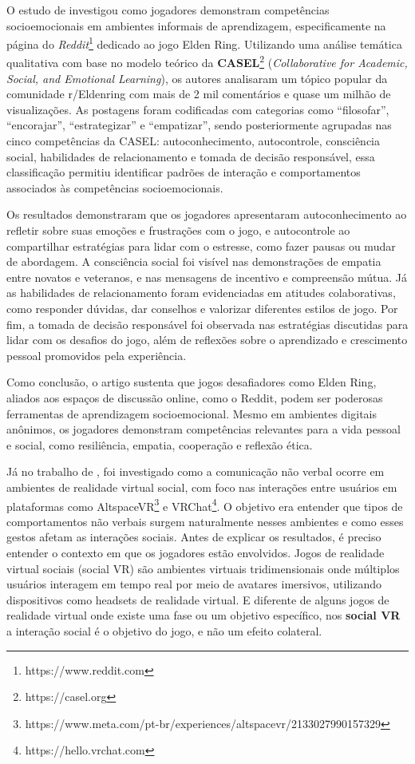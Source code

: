 
O  estudo de  investigou como jogadores demonstram competências socioemocionais em ambientes informais de aprendizagem, especificamente na página do \textit{Reddit}\footnote{https://www.reddit.com} dedicado ao jogo Elden Ring.
Utilizando uma análise temática qualitativa com base no modelo teórico da \textbf{CASEL}\footnote{https://casel.org} (\textit{Collaborative for Academic, Social, and Emotional Learning}), os autores analisaram um tópico popular da comunidade r/Eldenring com mais de 2 mil comentários e quase um milhão de visualizações.
As postagens foram codificadas com categorias como “filosofar”, “encorajar”, “estrategizar” e “empatizar”, sendo posteriormente agrupadas nas cinco competências da CASEL: autoconhecimento, autocontrole, consciência social, habilidades de relacionamento e tomada de decisão responsável, essa classificação permitiu identificar padrões de interação e comportamentos associados às competências socioemocionais.

Os resultados demonstraram que os jogadores apresentaram autoconhecimento ao refletir sobre suas emoções e frustrações com o jogo, e autocontrole ao compartilhar estratégias para lidar com o estresse, como fazer pausas ou mudar de abordagem.
A consciência social foi visível nas demonstrações de empatia entre novatos e veteranos, e nas mensagens de incentivo e compreensão mútua.
Já as habilidades de relacionamento foram evidenciadas em atitudes colaborativas, como responder dúvidas, dar conselhos e valorizar diferentes estilos de jogo.
Por fim, a tomada de decisão responsável foi observada nas estratégias discutidas para lidar com os desafios do jogo, além de reflexões sobre o aprendizado e crescimento pessoal promovidos pela experiência.

Como conclusão, o artigo sustenta que jogos desafiadores como Elden Ring, aliados aos espaços de discussão online, como o Reddit, podem ser poderosas ferramentas de aprendizagem socioemocional.
Mesmo em ambientes digitais anônimos, os jogadores demonstram competências relevantes para a vida pessoal e social, como resiliência, empatia, cooperação e reflexão ética.

Já no trabalho de , foi investigado como a comunicação não verbal ocorre em ambientes de realidade virtual social, com foco nas interações entre usuários em plataformas como AltspaceVR\footnote{https://www.meta.com/pt-br/experiences/altspacevr/2133027990157329} e VRChat\footnote{https://hello.vrchat.com}.
O objetivo era entender que tipos de comportamentos não verbais surgem naturalmente nesses ambientes e como esses gestos afetam as interações sociais.
Antes de explicar os resultados, é preciso entender o contexto em que os jogadores estão envolvidos.
Jogos de realidade virtual sociais (social VR) são ambientes virtuais tridimensionais onde múltiplos usuários interagem em tempo real por meio de avatares imersivos, utilizando dispositivos como headsets de realidade virtual.
E diferente de alguns jogos de realidade virtual onde existe uma fase ou um objetivo específico, nos \textbf{social VR} a interação social é o objetivo do jogo, e não um efeito colateral.

